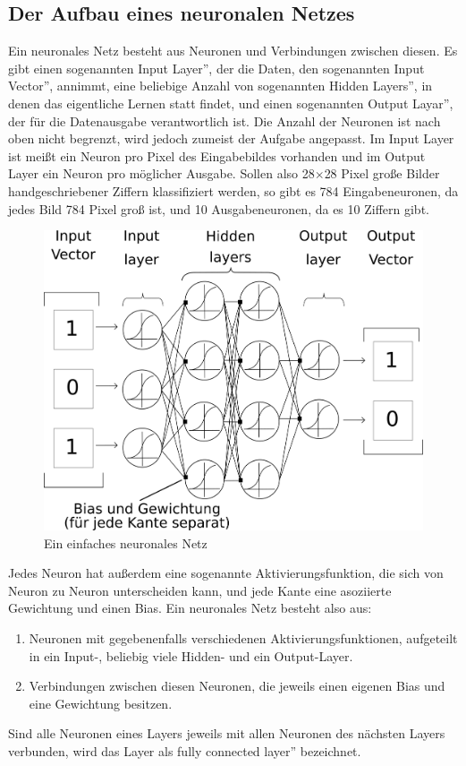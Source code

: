 \documentclass{article}
\begin{document}
\subsection{Der Aufbau eines neuronalen Netzes}
Ein neuronales Netz besteht aus Neuronen und Verbindungen zwischen diesen. Es gibt einen sogenannten \glqq Input Layer'', der die Daten, den sogenannten \glqq Input Vector'', annimmt, eine beliebige Anzahl von sogenannten \glqq Hidden Layers'', in denen das eigentliche Lernen statt findet, und einen sogenannten \glqq Output Layar'', der für die Datenausgabe verantwortlich ist. Die Anzahl der Neuronen ist nach oben nicht begrenzt, wird jedoch zumeist der Aufgabe angepasst. Im Input Layer ist meißt ein Neuron pro Pixel des Eingabebildes vorhanden und im Output Layer ein Neuron pro möglicher Ausgabe. Sollen also 28$\times$28 Pixel große Bilder handgeschriebener Ziffern klassifiziert werden, so gibt es 784 Eingabeneuronen, da jedes Bild 784 Pixel groß ist, und 10 Ausgabeneuronen, da es 10 Ziffern gibt.
\begin{figure}[h]
\centering
\includegraphics[width=\linewidth]{../graphics/Neural_Net.png}
\caption{Ein einfaches neuronales Netz}
\end{figure}
Jedes Neuron hat außerdem eine sogenannte Aktivierungsfunktion, die sich von Neuron zu Neuron unterscheiden kann, und jede Kante eine asoziierte Gewichtung und einen Bias. Ein neuronales Netz besteht also aus:\newline
\begin{enumerate}
	\item Neuronen mit gegebenenfalls verschiedenen Aktivierungsfunktionen, aufgeteilt in ein Input-, beliebig viele Hidden- und ein Output-Layer.
	\item Verbindungen zwischen diesen Neuronen, die jeweils einen eigenen Bias und eine Gewichtung besitzen.
\end{enumerate}
Sind alle Neuronen eines Layers jeweils mit allen Neuronen des nächsten Layers verbunden, wird das Layer als \glqq fully connected layer'' bezeichnet.
\end{document}
